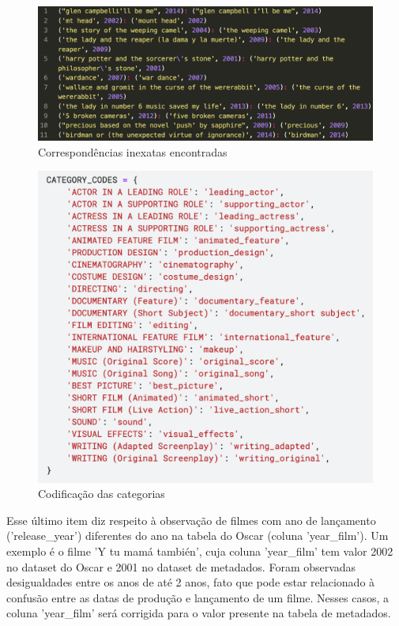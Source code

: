         \begin{figure}[htb]
        	\caption{\label{corresp}Correspondências inexatas encontradas}
        	\begin{center}
        		\includegraphics[scale=0.35]{corresp.png}
        	\end{center}
        \end{figure}
        
        \begin{figure}[htb]
        	\caption{\label{cat_cods}Codificação das categorias}
        	\begin{center}
        		\includegraphics[scale=0.7]{categ_codes.png}
        	\end{center}
        \end{figure}

        Esse último item diz respeito à observação de filmes com ano de lançamento ('release\_year') diferentes do ano na tabela do Oscar (coluna 'year\_film'). Um exemplo é o filme 'Y tu mamá también', cuja coluna 'year\_film' tem valor 2002 no dataset do Oscar e 2001 no dataset de metadados. Foram observadas desigualdades entre os anos de até 2 anos, fato que pode estar relacionado à confusão entre as datas de produção e lançamento de um filme. Nesses casos, a coluna 'year\_film' será corrigida para o valor presente na tabela de metadados.


